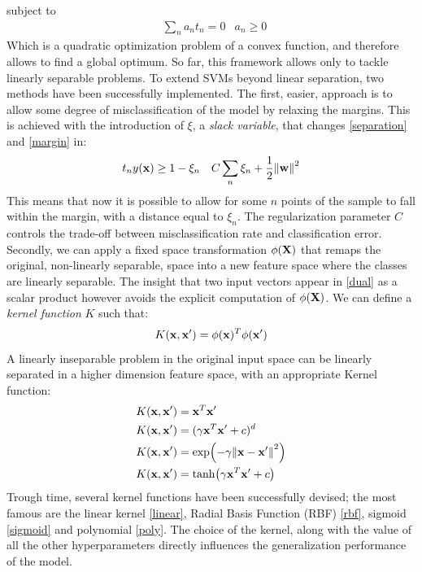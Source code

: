 \documentclass[nocrop]{bioinfo}
\begin{document}
\begin{methods}
\begin{equation}
\end{equation}
subject to
\begin{align}
		&\sum_n a_n t_n = 0 
		&a_n \geq 0 \
\end{align}
Which is a quadratic optimization problem of a convex function, and therefore allows to find a global optimum.
So far, this framework allows only to tackle linearly separable problems.
To extend SVMs beyond linear separation, two methods have been successfully implemented.
The first, easier, approach is to allow some degree of misclassification of the model by relaxing the margins. 
This is achieved with the introduction of $\xi$, a \textit{slack variable}, that changes \eqref{separation} and \eqref{margin} in:
\begin{align}
	&t_n y(\vb{x}) \geq 1 - \xi_n
    &C \sum_n \xi_n + \frac{1}{2}\norm{\vb{w}}^2
\end{align}
This means that now it is possible to allow for some $n$ points of the sample to fall within the margin, with a distance equal to $\xi_n$.
The regularization parameter $C$ controls the trade-off between misclassification rate and classification error. \newline
Secondly, we can apply a fixed space transformation $\phi(\vb{X})$ that remaps the original, non-linearly separable, space into a new feature space where the classes are linearly separable.
The insight that two input vectors appear in \eqref{dual} as a scalar product however avoids the explicit computation of $\phi(\vb{X})$. We can define a \textit{kernel function} $K$ such that:
\begin{equation}
	K(\vb{x}, \vb{x}^\prime) = \phi (\vb{x})^T \phi (\vb{x}^\prime) 
\end{equation}
A linearly inseparable problem in the original input space can be linearly separated in a higher dimension feature space, with an appropriate Kernel function:
\begin{align}
\label{linear}	&K(\vb{x}, \vb{x}^\prime) = \vb{x}^T \vb{x}^\prime \\
\label{poly}	&K(\vb{x}, \vb{x}^\prime) = (\gamma \vb{x}^T\vb{x}^\prime + c)^d \\
\label{rbf}	&K(\vb{x}, \vb{x}^\prime) = \exp(-\gamma\norm{\vb{x} - \vb{x}^\prime}^2) \\
\label{sigmoid}	&K(\vb{x}, \vb{x}^\prime) = \tanh(\gamma \vb{x}^T \vb{x}^\prime + c)
\end{align}
Trough time, several kernel functions have been successfully devised; the most famous are the linear kernel \eqref{linear}, Radial Basis Function (RBF) \eqref{rbf}, sigmoid \eqref{sigmoid} and polynomial \eqref{poly}.
The choice of the kernel, along with the value of all the other hyperparameters directly influences the generalization performance of the model.


\end{methods}
\end{document}
